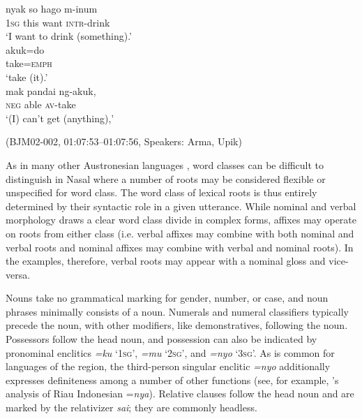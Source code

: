 \documentclass[output=paper,colorlinks,citecolor=brown
\ChapterDOI{10.5281/zenodo.15697585}
]{langscibook}
\begin{document}
\begin{exe}
    \ex\label{ex:wysiwyg} \begin{xlist}[0\quad A.:]
         \gll
        nyak so hago m-inum \\
        1\textsc{sg} this want \textsc{intr}-drink \\
        \glt `I want to drink (something).' \\
         \gll
        akuk=do \\
        take=\textsc{emph} \\
        \glt `take (it).' \\
         \gll
        mak pandai ng-akuk, \\
        \textsc{neg} able \textsc{av}-take \\
        \glt `(I) can't get (anything),' \\
    \end{xlist}
    \hfill (BJM02-002, 01:07:53–01:07:56, Speakers: Arma, Upik) 
\end{exe}

As in many other Austronesian languages \parencite[see][]{mosel2023word}, word classes can be difficult to distinguish in Nasal where a number of roots may be considered flexible or unspecified for word class. The word class of lexical roots is thus entirely determined by their syntactic role in a given utterance. While nominal and verbal morphology draws a clear word class divide in complex forms, affixes may operate on roots from either class (i.e. verbal affixes may combine with both nominal and verbal roots and nominal affixes may combine with verbal and nominal roots). In the examples, therefore, verbal roots may appear with a nominal gloss and vice-versa.

Nouns take no grammatical marking for gender, number, or case, and noun phrases minimally consists of a noun. Numerals and numeral classifiers typically precede the noun, with other modifiers, like demonstratives, following the noun. Possessors follow the head noun, and possession can also be indicated by pronominal enclitics \textit{=ku} `1\textsc{sg}', \textit{=mu} `2\textsc{sg}', and \textit{=nyo} `3\textsc{sg}'. As is common for languages of the region, the third-person singular enclitic \textit{=nyo} additionally expresses definiteness among a number of other functions (see, for example, \citeauthor{gil2005riauindonesian}'s \citeyear{gil2005riauindonesian} analysis of Riau Indonesian =\textit{nya}). Relative clauses follow the head noun and are marked by the relativizer \textit{sai}; they are commonly headless.
\end{document}
